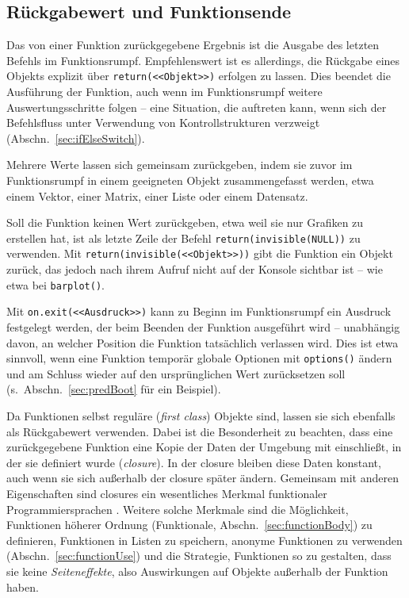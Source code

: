 \subsection{Rückgabewert und Funktionsende}

Das von einer Funktion zurückgegebene Ergebnis ist die Ausgabe des letzten Befehls im Funktionsrumpf. Empfehlenswert ist es allerdings, die Rückgabe eines Objekts explizit über \lstinline!return(<<Objekt>>)! erfolgen zu lassen. Dies beendet die Ausführung der Funktion, auch wenn im Funktionsrumpf weitere Auswertungsschritte folgen -- eine Situation, die auftreten kann, wenn sich der Befehlsfluss unter Verwendung von Kontrollstrukturen verzweigt (Abschn.\ \ref{sec:ifElseSwitch}).

Mehrere Werte lassen sich gemeinsam zurückgeben, indem sie zuvor im Funktionsrumpf in einem geeigneten Objekt zusammengefasst werden, etwa einem Vektor, einer Matrix, einer Liste oder einem Datensatz.

Soll die Funktion keinen Wert zurückgeben, etwa weil sie nur Grafiken zu erstellen hat, ist als letzte Zeile der Befehl \lstinline!return(invisible(NULL))! zu verwenden. Mit \lstinline!return(invisible(<<Objekt>>))! gibt die Funktion ein Objekt zurück, das jedoch nach ihrem Aufruf nicht auf der Konsole sichtbar ist -- wie etwa bei \lstinline!barplot()!.

Mit \lstinline!on.exit(<<Ausdruck>>)! kann zu Beginn im Funktionsrumpf ein Ausdruck festgelegt werden, der beim Beenden der Funktion ausgeführt wird -- unabhängig davon, an welcher Position die Funktion tatsächlich verlassen wird. Dies ist etwa sinnvoll, wenn eine Funktion temporär globale Optionen mit \lstinline!options()! ändern und am Schluss wieder auf den ursprünglichen Wert zurücksetzen soll (s.\ Abschn.\ \ref{sec:predBoot} für ein Beispiel).

Da Funktionen selbst reguläre (\emph{first class}) Objekte sind, lassen sie sich ebenfalls als Rückgabewert verwenden. Dabei ist die Besonderheit zu beachten, dass eine zurückgegebene Funktion eine Kopie der Daten der Umgebung mit einschließt, in der sie definiert wurde (\emph{closure}). In der closure bleiben diese Daten konstant, auch wenn sie sich außerhalb der closure später ändern. Gemeinsam mit anderen Eigenschaften sind closures ein wesentliches Merkmal funktionaler Programmiersprachen . Weitere solche Merkmale sind die Möglichkeit, Funktionen höherer Ordnung (Funktionale, Abschn.\ \ref{sec:functionBody}) zu definieren, Funktionen in Listen zu speichern, anonyme Funktionen zu verwenden (Abschn.\ \ref{sec:functionUse}) und die Strategie, Funktionen so zu gestalten, dass sie keine \emph{Seiteneffekte}, also Auswirkungen auf Objekte außerhalb der Funktion haben.

